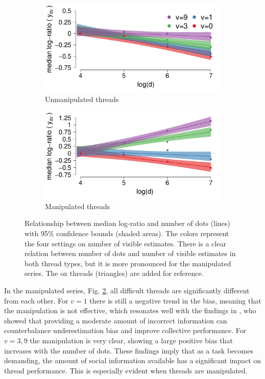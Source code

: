 \documentclass[9pt,twocolumn,twoside,lineno]{pnas-new}
\begin{document}
\begin{figure}[!ht]
\centering
	\begin{subfigure}[t]{.48\linewidth}
		\centering
		\includegraphics[width=1\linewidth]{../plots/med_confidence_h.pdf}			
		\caption{Unmanipulated threads}
		\label{fig: median confidence bounds - historic}
	\end{subfigure}
	\begin{subfigure}[t]{.48\linewidth}
		\centering
		\includegraphics[width=1\linewidth]{../plots/med_confidence_m.pdf}			
		\caption{Manipulated threads}
		\label{fig: median confidence bounds - manipulated}
	\end{subfigure}
	\caption{Relationship between median log-ratio and number of dots (lines) with 95\% confidence bounds (shaded areas). The colors represent the four settings on number of visible estimates. There is a clear relation between number of dots and number of visible estimates in both thread types, but it is more pronounced for the manipulated series. The ox threads (triangles) are added for reference.}\label{fig: median confidence bounds}
\end{figure}

In the manipulated series, Fig. \ref{fig: median confidence bounds - manipulated}, all difficult threads are significantly different from each other. For $v=1$ there is still a negative trend in the bias, meaning that the manipulation is not effective, which resonates well with the findings in \cite{jayles2017social}, who showed that providing a moderate amount of incorrect information can counterbalance underestimation bias and improve collective performance. For $v=3,9$ the manipulation is very clear, showing a large positive bias that increases with the number of dots. These findings imply that as a task becomes demanding, the amount of social information available has a significant impact on thread performance. This is especially evident when threads are manipulated.
\end{document}
